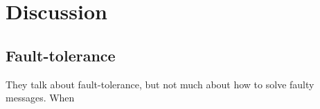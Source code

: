\section{Discussion}
\subsection{Fault-tolerance}
They talk about fault-tolerance, but not much about how to solve faulty messages.
When 
